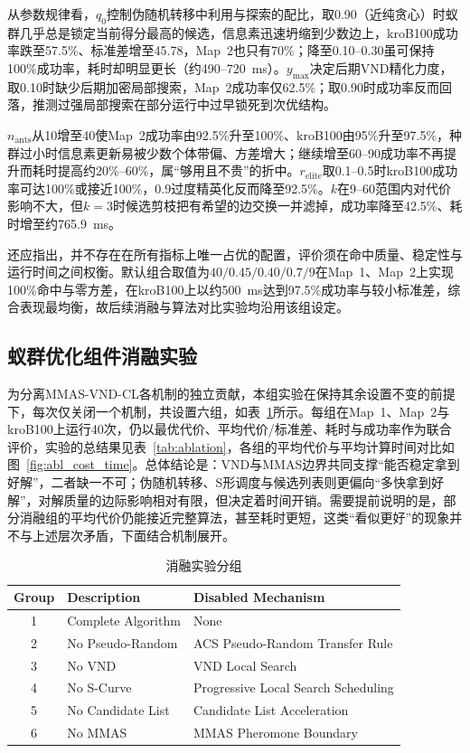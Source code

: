 \documentclass[lettersize,journal]{IEEEtran}
\begin{document}
从参数规律看，$q_0$控制伪随机转移中利用与探索的配比，取0.90（近纯贪心）时蚁群几乎总是锁定当前得分最高的候选，信息素迅速坍缩到少数边上，kroB100成功率跌至57.5\%、标准差增至45.78，Map~2也只有70\%；降至0.10--0.30虽可保持100\%成功率，耗时却明显更长（约490--720~ms）。$y_{\max}$决定后期VND精化力度，取0.10时缺少后期加密局部搜索，Map~2成功率仅62.5\%；取0.90时成功率反而回落，推测过强局部搜索在部分运行中过早锁死到次优结构。

$n_{\mathrm{ants}}$从10增至40使Map~2成功率由92.5\%升至100\%、kroB100由95\%升至97.5\%，种群过小时信息素更新易被少数个体带偏、方差增大；继续增至60--90成功率不再提升而耗时提高约20\%--60\%，属“够用且不贵”的折中。$r_{\mathrm{elite}}$取0.1--0.5时kroB100成功率可达100\%或接近100\%，0.9过度精英化反而降至92.5\%。$k$在9--60范围内对代价影响不大，但$k=3$时候选剪枝把有希望的边交换一并滤掉，成功率降至42.5\%、耗时增至约765.9~ms。

还应指出，并不存在在所有指标上唯一占优的配置，评价须在命中质量、稳定性与运行时间之间权衡。默认组合取值为$40/0.45/0.40/0.7/9$在Map~1、Map~2上实现100\%命中与零方差，在kroB100上以约500~ms达到97.5\%成功率与较小标准差，综合表现最均衡，故后续消融与算法对比实验均沿用该组设定。

\subsection{蚁群优化组件消融实验}

\label{subsec:exp_ablation}

为分离MMAS-VND-CL各机制的独立贡献，本组实验在保持其余设置不变的前提下，每次仅关闭一个机制，共设置六组，如表~\textcolor{blue}{\ref{tab:ablation_groups}}所示。每组在Map~1、Map~2与kroB100上运行40次，仍以最优代价、平均代价/标准差、耗时与成功率作为联合评价，实验的总结果见表~\textcolor{blue}{\ref{tab:ablation}}，各组的平均代价与平均计算时间对比如图~\textcolor{blue}{\ref{fig:abl_cost_time}}。总体结论是：VND与MMAS边界共同支撑“能否稳定拿到好解”，二者缺一不可；伪随机转移、S形调度与候选列表则更偏向“多快拿到好解”，对解质量的边际影响相对有限，但决定着时间开销。需要提前说明的是，部分消融组的平均代价仍能接近完整算法，甚至耗时更短，这类“看似更好”的现象并不与上述层次矛盾，下面结合机制展开。

\begin{table}[htbp]
\caption{消融实验分组}
\label{tab:ablation_groups}
\centering
\small
\setlength{\tabcolsep}{4pt}
\begin{tabular}{cll}
\toprule
Group & Description & Disabled Mechanism \\
\midrule
1 & Complete Algorithm & None \\
2 & No Pseudo-Random & ACS Pseudo-Random Transfer Rule \\
3 & No VND & VND Local Search \\
4 & No S-Curve & Progressive Local Search Scheduling \\
5 & No Candidate List & Candidate List Acceleration \\
6 & No MMAS & MMAS Pheromone Boundary \\
\bottomrule
\end{tabular}
\end{table}
\end{document}
